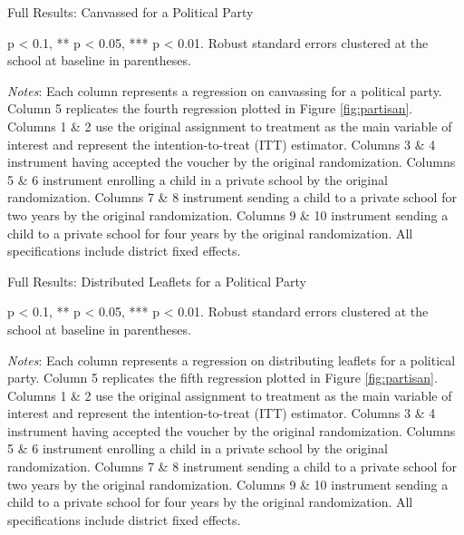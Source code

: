 \documentclass[hidelinks, 12pt, titlepage]{article}
\begin{document}
\begin{landscape}
					\clearpage

					\begin{table}
						\begin{threeparttable}
							\centering
							\caption{Full Results: Canvassed for a Political Party\label{table:appendixpoliticalcanvas}}
							
							\begin{tablenotes}
								\item * p < 0.1, ** p < 0.05, *** p < 0.01. Robust standard errors clustered at the school at baseline in parentheses.
								\item \emph{Notes}: Each column represents a regression on canvassing for a political party.  Column 5 replicates the fourth regression plotted in Figure \ref{fig:partisan}.  Columns 1 \& 2 use the original assignment to treatment as the main variable of interest and represent the intention-to-treat (ITT) estimator.  Columns 3 \& 4 instrument having accepted the voucher by the original randomization.  Columns 5 \& 6 instrument enrolling a child in a private school by the original randomization.  Columns 7 \& 8 instrument sending a child to a private school for two years by the original randomization.  Columns 9 \& 10 instrument sending a child to a private school for four years by the original randomization.  All specifications include district fixed effects.
							\end{tablenotes}
						\end{threeparttable}
					\end{table}
					\clearpage

					\begin{table}
						\begin{threeparttable}
							\centering
							\caption{Full Results: Distributed Leaflets for a Political Party\label{table:appendixpoliticalleaflets}}
							
							\begin{tablenotes}
								\item * p < 0.1, ** p < 0.05, *** p < 0.01. Robust standard errors clustered at the school at baseline in parentheses.
								\item \emph{Notes}: Each column represents a regression on distributing leaflets for a political party.  Column 5 replicates the fifth regression plotted in Figure \ref{fig:partisan}.  Columns 1 \& 2 use the original assignment to treatment as the main variable of interest and represent the intention-to-treat (ITT) estimator.  Columns 3 \& 4 instrument having accepted the voucher by the original randomization.  Columns 5 \& 6 instrument enrolling a child in a private school by the original randomization.  Columns 7 \& 8 instrument sending a child to a private school for two years by the original randomization.  Columns 9 \& 10 instrument sending a child to a private school for four years by the original randomization.  All specifications include district fixed effects.
							\end{tablenotes}
						\end{threeparttable}
					\end{table}
					\clearpage

				\end{landscape}
\end{document}
